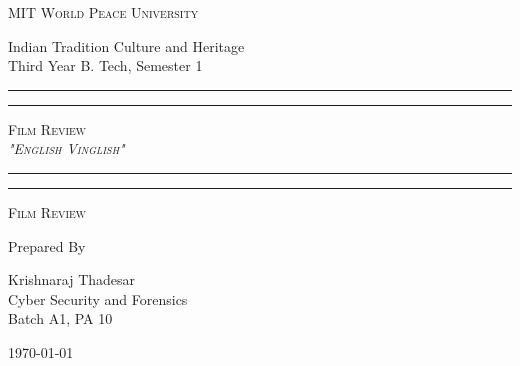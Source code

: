 \documentclass[11pt]{article}
\begin{document}
\begin{titlepage}
	\centering


	\huge\textsc{
		MIT World Peace University
	}\\

	\vspace{0.75\baselineskip} %

	\LARGE{
		Indian Tradition Culture and Heritage\\
		Third Year B. Tech, Semester 1
	}

	\vfill %


	\rule{\textwidth}{1.6pt}\vspace*{-\baselineskip}\vspace*{2pt}
	\rule{\textwidth}{0.6pt}
	\vspace{0.75\baselineskip} %



	\huge{\textsc{
			Film Review\\
			\textit{"English Vinglish"}
		}} \\



	\vspace{0.5\baselineskip} %
	\rule{\textwidth}{0.6pt}\vspace*{-\baselineskip}\vspace*{2.8pt}
	\rule{\textwidth}{1.6pt}

	\vspace{1\baselineskip} %


	\LARGE\textsc{
		Film Review
	} %
	\vfill


	Prepared By
	\vspace{0.5\baselineskip} %

	\Large{
		Krishnaraj Thadesar \\
		Cyber Security and Forensics\\
		Batch A1, PA 10
	}


	\vspace{0.5\baselineskip} %
	\today

\end{titlepage}
\end{document}
